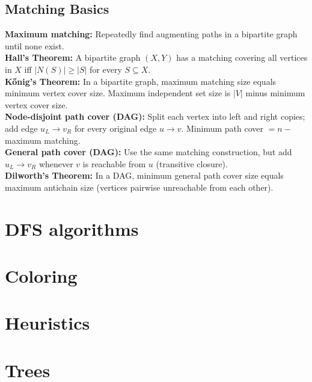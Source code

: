 	\subsection{Matching Basics}
		\textbf{Maximum matching:} Repeatedly find augmenting paths in a bipartite graph until none exist.\\
		\textbf{Hall's Theorem:} A bipartite graph $(X,Y)$ has a matching covering all vertices in $X$ iff $|N(S)|\ge |S|$ for every $S\subseteq X$.\\
		\textbf{Kőnig's Theorem:} In a bipartite graph, maximum matching size equals minimum vertex cover size. Maximum independent set size is $|V|$ minus minimum vertex cover size.\\
		\textbf{Node-disjoint path cover (DAG):} Split each vertex into left and right copies; add edge $u_L\to v_R$ for every original edge $u\to v$. Minimum path cover $=n-$ maximum matching.\\
		\textbf{General path cover (DAG):} Use the same matching construction, but add $u_L\to v_R$ whenever $v$ is reachable from $u$ (transitive closure).\\
		\textbf{Dilworth's Theorem:} In a DAG, minimum general path cover size equals maximum antichain size (vertices pairwise unreachable from each other).


\section{DFS algorithms}

\section{Coloring}

\section{Heuristics}

\section{Trees}

